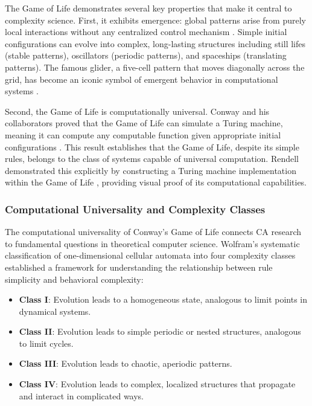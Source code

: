 The Game of Life demonstrates several key properties that make it central to complexity science. First, it exhibits emergence: global patterns arise from purely local interactions without any centralized control mechanism \cite{ilachinski2001cellular}. Simple initial configurations can evolve into complex, long-lasting structures including still lifes (stable patterns), oscillators (periodic patterns), and spaceships (translating patterns). The famous glider, a five-cell pattern that moves diagonally across the grid, has become an iconic symbol of emergent behavior in computational systems \cite{berlekamp2004winning}.

Second, the Game of Life is computationally universal. Conway and his collaborators proved that the Game of Life can simulate a Turing machine, meaning it can compute any computable function given appropriate initial configurations \cite{berlekamp2004winning}. This result establishes that the Game of Life, despite its simple rules, belongs to the class of systems capable of universal computation. Rendell demonstrated this explicitly by constructing a Turing machine implementation within the Game of Life \cite{rendell2002turing}, providing visual proof of its computational capabilities.

\subsubsection{Computational Universality and Complexity Classes}

The computational universality of Conway's Game of Life connects CA research to fundamental questions in theoretical computer science. Wolfram's systematic classification of one-dimensional cellular automata into four complexity classes \cite{wolfram1984universality,wolfram2002new} established a framework for understanding the relationship between rule simplicity and behavioral complexity:

\begin{itemize}
    \item \textbf{Class I}: Evolution leads to a homogeneous state, analogous to limit points in dynamical systems.
    \item \textbf{Class II}: Evolution leads to simple periodic or nested structures, analogous to limit cycles.
    \item \textbf{Class III}: Evolution leads to chaotic, aperiodic patterns.
    \item \textbf{Class IV}: Evolution leads to complex, localized structures that propagate and interact in complicated ways.
\end{itemize}

